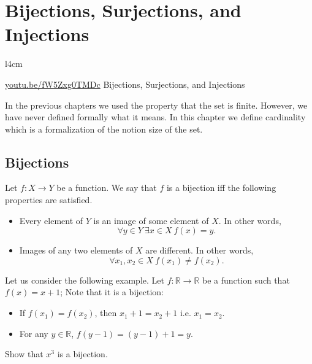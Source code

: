 \chapter{Bijections, Surjections, and Injections}
\label{chapter:bijections-surjections-injections}
\begin{wrapfigure}{l}{4cm}
  \begin{center}
    \vskip -0.5cm
    \vskip 0.25cm
    \href{https://youtu.be/fW5Zxg0TMDc}{youtu.be/fW5Zxg0TMDc}
    {\footnotesize Bijections, Surjections, and Injections}
  \end{center}
  \vskip -2cm
\end{wrapfigure}

In the previous chapters we used the property that the set is finite. However,
we have never defined formally what it means. In this chapter we define
cardinality which is a formalization of the notion size of the set.

\section{Bijections}
\begin{definition}
  Let $f : X \to Y$ be a function. We say that $f$ is a bijection iff the
  following properties are satisfied.
  \begin{itemize}
    \item Every element of $Y$ is an image of some element of $X$. In other
    words,
      $$
          \forall y \in Y~\exists x \in X\ f(x) = y.
      $$
    \item Images of any two elements
      of $X$ are different. In other words,
      $$
          \forall x_1, x_2 \in X\ f(x_1) \neq f(x_2).
      $$
    \end{itemize}
\end{definition}

Let us consider the following example. Let $f : \mathbb{R} \to \mathbb{R}$ be a
function such that $f(x) = x + 1$; Note that it is a bijection:
\begin{itemize}
  \item If $f(x_1) = f(x_2)$, then $x_1 + 1 = x_2 + 1$ i.e. $x_1 = x_2$.
  \item For any $y \in \mathbb{R}$, $f(y - 1) = (y - 1) + 1 = y$.
\end{itemize}


\begin{exercise}
  Show that $x^3$ is a bijection.
\end{exercise}


